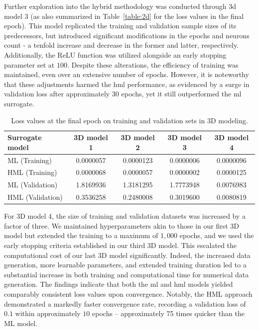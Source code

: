 Further exploration into the hybrid methodology was conducted through \ac{3d} model $3$ (as also summarized in Table~\ref{table:2d} for the loss values in the final epoch). This model replicated the training and validation sample sizes of its predecessors, but introduced significant modifications in the epochs and neurons count - a tenfold increase and decrease in the former and latter, respectively. Additionally, the ReLU function was utilized alongside an early stopping parameter set at $100$. Despite these alterations, the efficiency of training was maintained, even over an extensive number of epochs. However, it is noteworthy that these adjustments harmed the \ac{hml} performance, as evidenced by a surge in validation loss after approximately $30$ epochs, yet it still outperformed the \ac{ml} surrogate.
%
\begin{table}
\centering
\caption{Loss values at the final epoch on training and validation sets in 3D modeling.\label{table:3d}}
\begin{tabular}{lcccc}
\toprule
\textbf{Surrogate model} &  \textbf{3D model 1} &  \textbf{3D model 2} &  \textbf{3D model 3} &  \textbf{3D model 4} \\
\midrule
ML (Training)   &   0.0000057 &   0.0000123 &   0.0000006 &   0.0000096 \\
HML (Training)  &   0.0000068 &   0.0000057 &   0.0000002 &   0.0000125 \\
ML (Validation) &   1.8169936 &   1.3181295 &   1.7773948 &   0.0076983 \\
HML (Validation)&   0.3536258 &   0.2480008 &   0.3019600 &   0.0080819 \\
\bottomrule
\end{tabular}
\end{table}


For 3D model 4, the size of training and validation datasets was increased by a factor of three. We maintained hyperparameters akin to those in our first 3D model but extended the training to a maximum of $1,000$ epochs, and we used the early stopping criteria established in our third 3D model. This escalated the computational cost of our last 3D model significantly. Indeed, the increased data generation, more learnable parameters, and extended training duration led to a substantial increase in both training and computational time for numerical data generation. The findings indicate that both the \ac{ml} and \ac{hml} models yielded comparably consistent loss values upon convergence. Notably, the HML approach demonstrated a markedly faster convergence rate, recording a validation loss of $0.1$ within approximately $10$ epochs – approximately 75 times quicker than the ML model.


